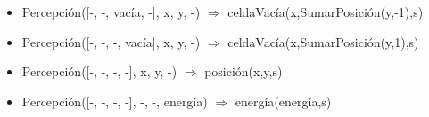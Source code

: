 \begin{itemize}
\item Percepción([-, -, vacía, -], x, y, -) $\Rightarrow$
\newline celdaVacía(x,SumarPosición(y,-1),s)

\item Percepción([-, -, -, vacía], x, y, -) $\Rightarrow$
\newline celdaVacía(x,SumarPosición(y,1),s)

\item Percepción([-, -, -, -], x, y, -) $\Rightarrow$ posición(x,y,s)

\item Percepción([-, -, -, -], -, -, energía) $\Rightarrow$ energía(energía,s)

\end{itemize}

